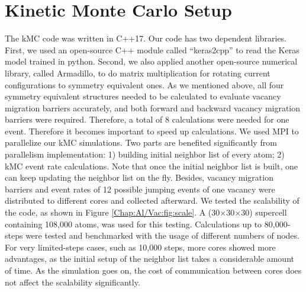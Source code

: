 \section{Kinetic Monte Carlo Setup}
\label{Chap:Al/Vac:section:KMC}


The \ac{kMC} code was written in C++17\cite{Zhang2020KNN2}. Our code has two dependent libraries. First, we used an open-source C++ module called ``keras2cpp'' to read the Keras model trained in python\cite{Perevozchikov2019}. Second, we also applied another open-source numerical library, called Armadillo\cite{sanderson2016armadillo, sanderson2018user}, to do matrix multiplication for rotating current configurations to symmetry equivalent ones. As we mentioned above, all four symmetry equivalent structures needed to be calculated to evaluate vacancy migration barriers accurately, and both forward and backward vacancy migration barriers were required. Therefore, a total of 8 calculations were needed for one event. Therefore it becomes important to speed up calculations. We used \ac{MPI} to parallelize our \ac{kMC} simulations. Two parts are benefited significantly from parallelism implementation: 1) building initial neighbor list of every atom; 2) \ac{kMC} event rate calculations. Note that once the initial neighbor list is built, one can keep updating the neighbor list on the fly. Besides, vacancy migration barriers and event rates of 12 possible jumping events of one vacancy were distributed to different cores and collected afterward. We tested the scalability of the code, as shown in Figure \ref{Chap:Al/Vac:fig:scale}. A (30$\times$30$\times$30) supercell containing 108,000 atoms, was used for this testing. Calculations up to 80,000-steps were tested and benchmarked with the usage of different numbers of nodes. For very limited-steps cases, such as 10,000 steps, more cores showed more advantages, as the initial setup of the neighbor list takes a considerable amount of time. As the simulation goes on, the cost of communication between cores does not affect the scalability significantly.


